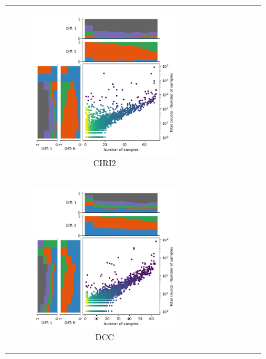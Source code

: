 \begin{figure}[ht]
\begin{tabular}{cc}
\begin{subfigure}{.4\textwidth}
            \includegraphics[width=\linewidth]{chapters/4_results_and_discussion/figures/detection/density/ciri2.png}
            \caption{CIRI2}
            \label{fig:detection_density_ciri2}
        \end{subfigure}     \\
        \begin{subfigure}{.4\textwidth}
            \centering

            \includegraphics[width=\linewidth]{chapters/4_results_and_discussion/figures/detection/density/dcc.png}
            \caption{DCC}
            \label{fig:detection_density_dcc}
        \end{subfigure}
         &
        \begin{subfigure}{.4\textwidth}
            \centering


\end{subfigure}
\end{tabular}
\end{figure}
